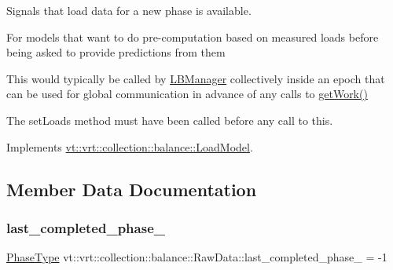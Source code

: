 Signals that load data for a new phase is available. 

For models that want to do pre-\/computation based on measured loads before being asked to provide predictions from them

This would typically be called by \hyperlink{structvt_1_1vrt_1_1collection_1_1balance_1_1_l_b_manager}{L\+B\+Manager} collectively inside an epoch that can be used for global communication in advance of any calls to \hyperlink{structvt_1_1vrt_1_1collection_1_1balance_1_1_raw_data_abb4ce5d944f229b411d9a3b61f370822}{get\+Work()}

The {\ttfamily set\+Loads} method must have been called before any call to this. 

Implements \hyperlink{classvt_1_1vrt_1_1collection_1_1balance_1_1_load_model_a4f1c6fb5d7d7a0b147755f025b1d5f5c}{vt\+::vrt\+::collection\+::balance\+::\+Load\+Model}.



\subsection{Member Data Documentation}
\mbox{\label{structvt_1_1vrt_1_1collection_1_1balance_1_1_raw_data_a9ceb9cf1dd88772821658e506d015397}} 
\subsubsection{\texorpdfstring{last\+\_\+completed\+\_\+phase\+\_\+}{last\_completed\_phase\_}}
{\footnotesize\ttfamily \hyperlink{namespacevt_a46ce6733d5cdbd735d561b7b4029f6d7}{Phase\+Type} vt\+::vrt\+::collection\+::balance\+::\+Raw\+Data\+::last\+\_\+completed\+\_\+phase\+\_\+ = -\/1}

\mbox{\label{structvt_1_1vrt_1_1collection_1_1balance_1_1_raw_data_a1e350ebf1bd9b3c94fdbc371779b8832}} 
